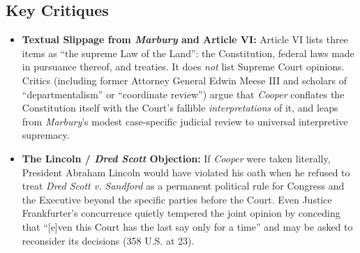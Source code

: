 \documentclass[12pt]{article}
\begin{document}
\subsection{Key Critiques}
\begin{itemize}
  \item \textbf{Textual Slippage from \textit{Marbury} and Article VI:} Article VI lists three items as ``the supreme Law of the Land'': the Constitution, federal laws made in pursuance thereof, and treaties. It does \emph{not} list Supreme Court opinions. Critics (including former Attorney General Edwin Meese III and scholars of ``departmentalism'' or ``coordinate review'') argue that \textit{Cooper} conflates the Constitution itself with the Court's fallible \emph{interpretations} of it, and leaps from \textit{Marbury}'s modest case-specific judicial review to universal interpretive supremacy.
  \item \textbf{The Lincoln / \textit{Dred Scott} Objection:} If \textit{Cooper} were taken literally, President Abraham Lincoln would have violated his oath when he refused to treat \textit{Dred Scott v. Sandford} as a permanent political rule for Congress and the Executive beyond the specific parties before the Court. Even Justice Frankfurter's concurrence quietly tempered the joint opinion by conceding that ``[e]ven this Court has the last say only for a time'' and may be asked to reconsider its decisions (358 U.S. at 23).
\end{itemize}
\end{document}
